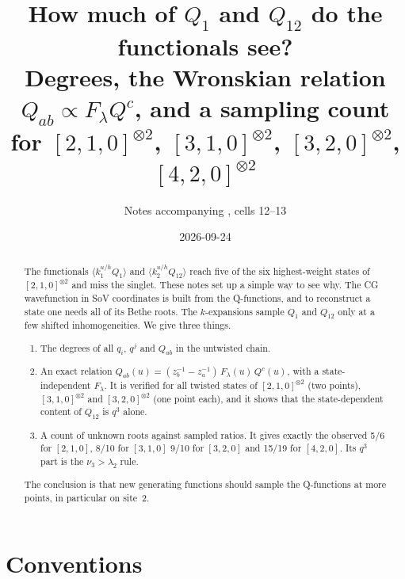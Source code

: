 \documentclass[11pt]{article}
\title{How much of $Q_1$ and $Q_{12}$ do the functionals see?\\
Degrees, the Wronskian relation $Q_{ab}\propto F_\lambda Q^c$, and a sampling count for $[2,1,0]^{\otimes2}$, $[3,1,0]^{\otimes2}$, $[3,2,0]^{\otimes2}$, $[4,2,0]^{\otimes2}$}
\author{Notes accompanying \nb{L2-mathcalA.wb}, cells 12--13}
\date{2026-09-24}
\theoremstyle{definition}
\theoremstyle{remark}
\begin{document}
\maketitle

\begin{abstract}
The functionals $\langle k_1^{u/h}Q_1\rangle$ and $\langle k_2^{u/h}Q_{12}\rangle$ reach five of the six highest-weight states of $[2,1,0]^{\otimes2}$ and miss the singlet. These notes set up a simple way to see why. The CG wavefunction in SoV coordinates is built from the Q-functions, and to reconstruct a state one needs all of its Bethe roots. The $k$-expansions sample $Q_1$ and $Q_{12}$ only at a few shifted inhomogeneities. We give three things.
\begin{enumerate}
\item The degrees of all $q_i$, $q^j$ and $Q_{ab}$ in the untwisted chain.
\item An exact relation $Q_{ab}(u)=(z_b^{-1}-z_a^{-1})\,F_\lambda(u)\,Q^c(u)$, with a state-independent $F_\lambda$. It is verified for all twisted states of $[2,1,0]^{\otimes2}$ (two points), $[3,1,0]^{\otimes2}$ and $[3,2,0]^{\otimes2}$ (one point each), and it shows that the state-dependent content of $Q_{12}$ is $q^3$ alone.
\item A count of unknown roots against sampled ratios. It gives exactly the observed 5/6 for $[2,1,0]$, 8/10 for $[3,1,0]$ 9/10 for $[3,2,0]$ and 15/19 for $[4,2,0]$. Its $q^3$ part is the $\nu_3>\lambda_2$ rule.
\end{enumerate}
The conclusion is that new generating functions should sample the Q-functions at more points, in particular on site~2.
\end{abstract}

\section{Conventions}
\end{document}

